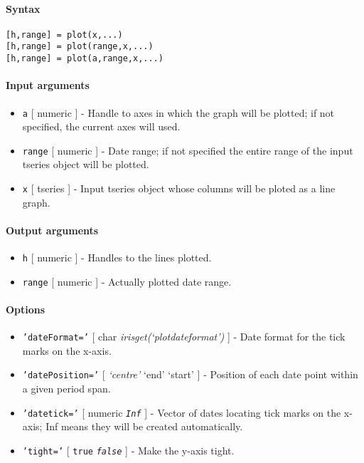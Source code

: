 


	\paragraph{Syntax}

\begin{verbatim}
[h,range] = plot(x,...)
[h,range] = plot(range,x,...)
[h,range] = plot(a,range,x,...)
\end{verbatim}

\paragraph{Input arguments}

\begin{itemize}
\item
  \texttt{a} {[} numeric {]} - Handle to axes in which the graph will be
  plotted; if not specified, the current axes will used.
\item
  \texttt{range} {[} numeric {]} - Date range; if not specified the
  entire range of the input tseries object will be plotted.
\item
  \texttt{x} {[} tseries {]} - Input tseries object whose columns will
  be ploted as a line graph.
\end{itemize}

\paragraph{Output arguments}

\begin{itemize}
\item
  \texttt{h} {[} numeric {]} - Handles to the lines plotted.
\item
  \texttt{range} {[} numeric {]} - Actually plotted date range.
\end{itemize}

\paragraph{Options}

\begin{itemize}
\item
  \texttt{'dateFormat='} {[} char \textbar{}
  \emph{irisget(`plotdateformat')} {]} - Date format for the tick marks
  on the x-axis.
\item
  \texttt{'datePosition='} {[} \emph{`centre'} \textbar{} `end'
  \textbar{} `start' {]} - Position of each date point within a given
  period span.
\item
  \texttt{'datetick='} {[} numeric \textbar{} \emph{\texttt{Inf}} {]} -
  Vector of dates locating tick marks on the x-axis; Inf means they will
  be created automatically.
\item
  \texttt{'tight='} {[} \texttt{true} \textbar{} \emph{\texttt{false}}
  {]} - Make the y-axis tight.
\end{itemize}

